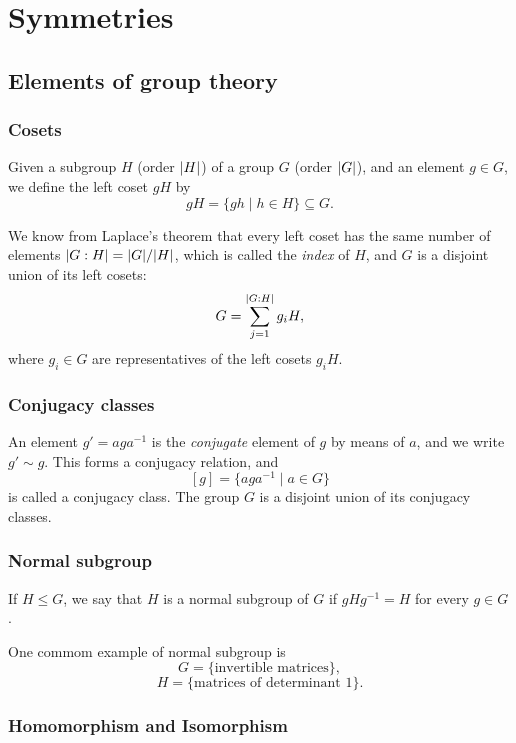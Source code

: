 \documentclass[a4paper,12pt]{report}
\begin{document}
\chapter{Symmetries}
%

\section{Elements of group theory}

\subsection{Cosets}

Given a subgroup $H$ (order $\abs{H}$) of a group $G$ (order $\abs{G}$), and an element $g \in G$, we define the left coset $gH$ by
$$
gH = \{gh \mid h \in H\} \subseteq G.
$$

We know from Laplace's theorem that every left coset has the same number of elements $\abs{G:H} = \abs{G} / \abs{H}$, which is called the \textit{index} of $H$, and $G$ is a disjoint union of its left cosets:
$$
G = \sum_{j=1}^{\abs{G:H}} g_i H,
$$
where $g_i \in G$ are representatives of the left cosets $g_i H$.

\subsection{Conjugacy classes}

An element $g' = a g a^{-1}$ is the \textit{conjugate} element of $g$ by means of $a$, and we write $g' \sim g$. This forms a conjugacy relation, and
$$
[g] = \{a g a^{-1} \mid a \in G\}
$$
is called a conjugacy class. The group $G$ is a disjoint union of its conjugacy classes.

\subsection{Normal subgroup}

If $H \leq G$, we say that $H$ is a normal subgroup of $G$ if $g H g^{-1} = H$ for every $g \in G$.

One commom example of normal subgroup is
$$
G = \{ \text{invertible matrices} \},
$$
$$
H = \{ \text{matrices of determinant 1} \}.
$$

\subsection{Homomorphism and Isomorphism}
\end{document}
